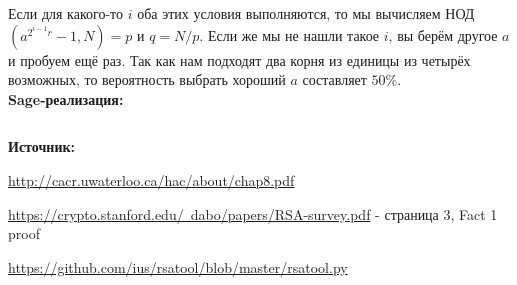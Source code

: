 \documentclass[12pt,a4paper]{scrartcl}
\begin{document}
Если для какого-то $i$ оба этих условия выполняются, то мы вычисляем НОД$(a^{2^{i-1}r}-1,N)=p$ и $q = N/p$. Если же мы не нашли такое $i$, вы берём другое $a$ и пробуем ещё раз. Так как нам подходят два корня из единицы из четырёх возможных, то вероятность выбрать хороший $a$ составляет $50\%$.\\

\textbf{Sage-реализация:}

\inputminted[tabsize=4,obeytabs,fontsize=\footnotesize]{python3}{./RSA_scripts/factor_modul.sage}


\textbf{Источник:}

\href{http://cacr.uwaterloo.ca/hac/about/chap8.pdf}{http://cacr.uwaterloo.ca/hac/about/chap8.pdf}

\href{https://crypto.stanford.edu/~dabo/papers/RSA-survey.pdf}{https://crypto.stanford.edu/~dabo/papers/RSA-survey.pdf} - страница 3, Fact 1 proof

\href{https://github.com/ius/rsatool/blob/master/rsatool.py}{https://github.com/ius/rsatool/blob/master/rsatool.py}
\end{document}
